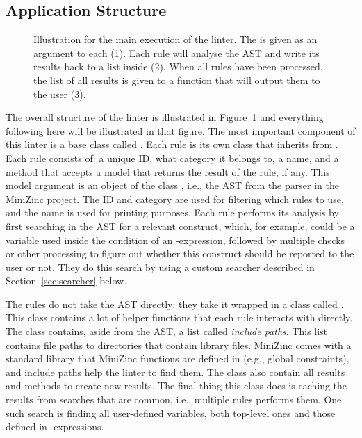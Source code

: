 \documentclass[a4paper,12pt]{article}
\begin{document}
\subsection{Application Structure}\label{sec:impl:structure}
\begin{figure}[t]
  \centering
  \smallskip%
  
  \smallskip%
  \caption{Illustration for the main execution of the linter. The  is given as
    an argument to each  (1). Each rule will analyse the AST and write its
    results back to a list inside  (2). When all rules have been processed, 
    the list of all results is given to a function that will output them to the user
    (3).}%
  \label{fig:overview}
\end{figure}

The overall structure of the linter is illustrated in Figure~\ref{fig:overview} and
everything following here will be illustrated in that figure. The most important component
of this linter is a base class called . Each rule
is its own class that inherits from . Each rule
consists of: a unique ID, what category it belongs to,
a name, and a method that accepts a model that returns the result of the rule, if any.
This model argument is an object of the class , i.e., the AST from the parser
in the MiniZinc project.
The ID and category are used for filtering which rules to use, and the name is used
for printing purposes. Each rule performs its analysis by first searching in the AST for a
relevant construct, which, for example, could be a variable used inside the condition of an
-expression, followed by multiple checks or other processing to figure out whether
this construct should be reported to the user or not. They do this search by using a
custom searcher described in Section~\ref{sec:searcher} below.

\begin{sloppypar}
The rules do not take the AST directly: they take it wrapped in a class called
. This class contains a lot of helper functions that each rule interacts with
directly. The class  contains, aside from the AST, a list called \emph{include paths}.
This list contains file paths to directories that contain library files.
MiniZinc comes with a standard library that MiniZinc functions are defined in (e.g., global constraints), and include paths help the linter to find them.
The class  also contain all results and methods to create new results. The final thing
this class does is caching the results from searches that are common, i.e., multiple rules performs them.
One such search is finding all user-defined variables, both top-level ones and those defined in -expressions.
\end{sloppypar}
\end{document}
